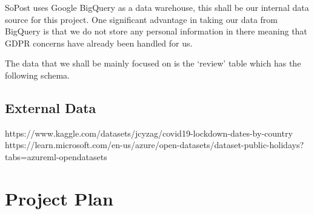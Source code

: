 \documentclass[12pt]{scrartcl}
\begin{document}
SoPost uses Google BigQuery as a data warehouse, this shall be our internal data source
for this project. One significant advantage in taking our data from BigQuery is that
we do not store any personal information in there meaning that GDPR concerns have already
been handled for us.

The data that we shall be mainly focused on is the `review' table which has the following
schema.



\subsection{External Data}
https://www.kaggle.com/datasets/jcyzag/covid19-lockdown-dates-by-country
https://learn.microsoft.com/en-us/azure/open-datasets/dataset-public-holidays?tabs=azureml-opendatasets

\section{Project Plan}

\end{document}
